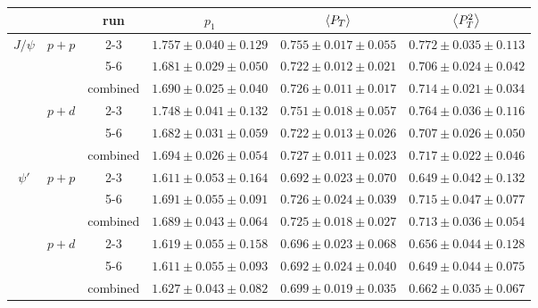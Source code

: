 \begin{tabular}{cc|c|c|c|c}
\hline
                      &                        & run      & $p_1$                   & $\expval{P_T}$          & $\expval{P^2_T}$        \\ \hline
\multicolumn{1}{c|}{\multirow{6}{*}{$J/\psi$}} & \multirow{3}{*}{$p+p$} & 2-3 & $1.757\pm0.040\pm0.129$ & $0.755\pm0.017\pm0.055$ & $0.772\pm0.035\pm0.113$ \\ \cline{3-6} 
\multicolumn{1}{c|}{} &                        & 5-6      & $1.681\pm0.029\pm0.050$ & $0.722\pm0.012\pm0.021$ & $0.706\pm0.024\pm0.042$ \\ \cline{3-6} 
\multicolumn{1}{c|}{} &                        & combined & $1.690\pm0.025\pm0.040$ & $0.726\pm0.011\pm0.017$ & $0.714\pm0.021\pm0.034$ \\ \cline{2-6} 
\multicolumn{1}{c|}{} & \multirow{3}{*}{$p+d$} & 2-3      & $1.748\pm0.041\pm0.132$ & $0.751\pm0.018\pm0.057$ & $0.764\pm0.036\pm0.116$ \\ \cline{3-6} 
\multicolumn{1}{c|}{} &                        & 5-6      & $1.682\pm0.031\pm0.059$ & $0.722\pm0.013\pm0.026$ & $0.707\pm0.026\pm0.050$ \\ \cline{3-6} 
\multicolumn{1}{c|}{} &                        & combined & $1.694\pm0.026\pm0.054$ & $0.727\pm0.011\pm0.023$ & $0.717\pm0.022\pm0.046$ \\ \hline
\multicolumn{1}{c|}{\multirow{6}{*}{$\psi'$}}  & \multirow{3}{*}{$p+p$} & 2-3 & $1.611\pm0.053\pm0.164$ & $0.692\pm0.023\pm0.070$ & $0.649\pm0.042\pm0.132$ \\ \cline{3-6} 
\multicolumn{1}{c|}{} &                        & 5-6      & $1.691\pm0.055\pm0.091$ & $0.726\pm0.024\pm0.039$ & $0.715\pm0.047\pm0.077$ \\ \cline{3-6} 
\multicolumn{1}{c|}{} &                        & combined & $1.689\pm0.043\pm0.064$ & $0.725\pm0.018\pm0.027$ & $0.713\pm0.036\pm0.054$ \\ \cline{2-6} 
\multicolumn{1}{c|}{} & \multirow{3}{*}{$p+d$} & 2-3      & $1.619\pm0.055\pm0.158$ & $0.696\pm0.023\pm0.068$ & $0.656\pm0.044\pm0.128$ \\ \cline{3-6} 
\multicolumn{1}{c|}{} &                        & 5-6      & $1.611\pm0.055\pm0.093$ & $0.692\pm0.024\pm0.040$ & $0.649\pm0.044\pm0.075$ \\ \cline{3-6} 
\multicolumn{1}{c|}{} &                        & combined & $1.627\pm0.043\pm0.082$ & $0.699\pm0.019\pm0.035$ & $0.662\pm0.035\pm0.067$ \\ \hline
\end{tabular}